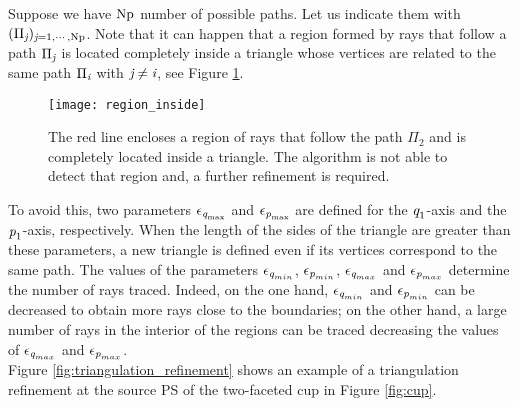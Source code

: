 \noindent Suppose we have $\textrm{Np}$ number of possible paths. Let us indicate them with $(\Pi_{\textit{j}})_{\textit{j}=1, \cdots, \textrm{Np}}$. 
Note that it can happen that a region formed by rays that follow a path $\Pi_{\textit{j}}$ is located completely inside a triangle whose vertices are related to the same path $\Pi_{\textit{i}}$ with $\textit{j} \neq  \textit{i}$, see Figure \ref{fig:region inside}. 
\begin{figure}[h]
  \begin{center}
  \texttt{[image: region\_inside]}
  \end{center}
  \caption{The red line encloses a region of rays that follow the path $\Pi_2$ and is completely located inside a triangle.
  The algorithm is not able to detect that region and, a further refinement is required.}
   \label{fig:region inside}
  \end{figure}
To avoid this, two parameters $\epsilon_{\textit{q}_{\textrm{max}}}$ and $\epsilon_{\textit{p}_{\textrm{max}}}$ are defined for the $\textit{q}_1$-axis and the $\textit{p}_1$-axis, respectively. 
When the length of the sides of the triangle are greater than these parameters, a new triangle is defined even if its vertices correspond to the same path. 
The values of the parameters $\epsilon_{\textit{q}_{min}}$, $\epsilon_{\textit{p}_{min}}$, $\epsilon_{\textit{q}_{max}}$ and $\epsilon_{\textit{p}_{max}}$ determine the number of rays traced.
Indeed, on the one hand, $\epsilon_{\textit{q}_{min}}$ and $\epsilon_{\textit{p}_{min}}$ can be decreased to obtain more rays close to the boundaries;
on the other hand, a large number of rays in the interior of the regions can be traced decreasing the values of $\epsilon_{\textit{q}_{max}}$ and $\epsilon_{\textit{p}_{max}}$. %
\\ \indent  Figure \ref{fig:triangulation_refinement} shows an example of a triangulation refinement at the source PS of the two-faceted cup in Figure \ref{fig:cup}.

